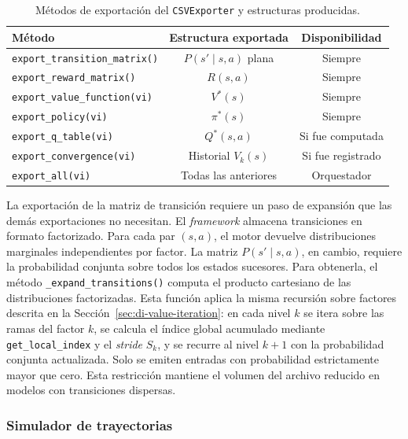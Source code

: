 \begin{table}[ht]
\centering
\caption{Métodos de exportación del \texttt{CSVExporter} y estructuras producidas.}
\label{tab:csv-exportaciones}
\begin{tabular}{lcc}
\hline
\textbf{Método} & \textbf{Estructura exportada} & \textbf{Disponibilidad} \\
\hline
\texttt{export\_transition\_matrix()} & $P(s' \mid s, a)$ plana  & Siempre \\
\texttt{export\_reward\_matrix()}      & $R(s, a)$                & Siempre \\
\texttt{export\_value\_function(vi)}   & $V^*(s)$                 & Siempre \\
\texttt{export\_policy(vi)}            & $\pi^*(s)$               & Siempre \\
\texttt{export\_q\_table(vi)}          & $Q^*(s, a)$              & Si fue computada \\
\texttt{export\_convergence(vi)}       & Historial $V_k(s)$       & Si fue registrado \\
\texttt{export\_all(vi)}               & Todas las anteriores     & Orquestador \\
\hline
\end{tabular}
\end{table}

La exportación de la matriz de transición requiere un paso de expansión que las
demás exportaciones no necesitan. El \textit{framework} almacena transiciones en formato factorizado. Para cada par $(s,a)$, el motor devuelve distribuciones
marginales independientes por factor. La matriz $P(s' \mid s, a)$, en cambio,
requiere la probabilidad conjunta sobre todos los estados sucesores. Para obtenerla,
el método \texttt{\_expand\_transitions()} computa el producto cartesiano de las
distribuciones factorizadas. Esta función aplica la misma recursión sobre factores
descrita en la Sección~\ref{sec:di-value-iteration}: en cada nivel $k$ se itera
sobre las ramas del factor $k$, se calcula el índice global acumulado mediante
\texttt{get\_local\_index} y el \textit{stride} $S_k$, y se recurre al nivel $k+1$
con la probabilidad conjunta actualizada. Solo se emiten entradas con probabilidad
estrictamente mayor que cero. Esta restricción mantiene el volumen del archivo
reducido en modelos con transiciones dispersas.

\subsubsection{Simulador de trayectorias}
\label{sec:di-simulator}

